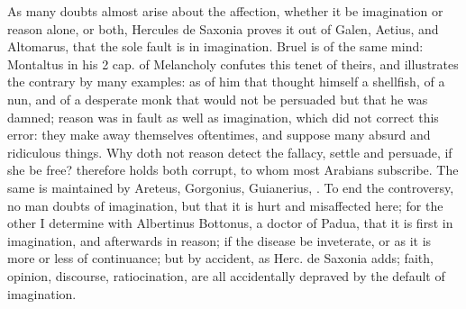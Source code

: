 {{As many doubts almost arise about the affection, whether it be
imagination or reason alone, or both, Hercules de Saxonia proves it out
of Galen, Aetius, and Altomarus, that the sole fault is in
imagination. Bruel is of the same mind: Montaltus in his 2 cap.
of Melancholy confutes this tenet of theirs, and illustrates the
contrary by many examples: as of him that thought himself a shellfish,
of a nun, and of a desperate monk that would not be persuaded but that
he was damned; reason was in fault as well as imagination, which did
not correct this error: they make away themselves oftentimes, and
suppose many absurd and ridiculous things. Why doth not reason detect
the fallacy, settle and persuade, if she be free? \Avicenna{}
therefore holds both corrupt, to whom most Arabians subscribe. The same
is maintained by Areteus, Gorgonius, Guianerius, \etc{}. To end
the controversy, no man doubts of imagination, but that it is hurt and
misaffected here; for the other I determine with  Albertinus
Bottonus, a doctor of Padua, that it is first in imagination, and
afterwards in reason; if the disease be inveterate, or as it is more or
less of continuance; but by accident, as Herc. de Saxonia adds;
faith, opinion, discourse, ratiocination, are all accidentally depraved
by the default of imagination.

}}

